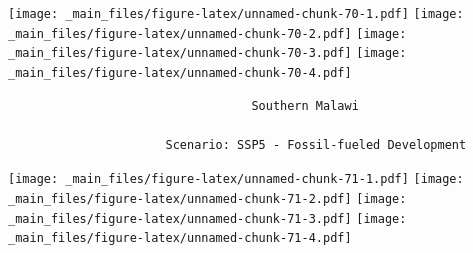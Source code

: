 \documentclass[
]{book}
\begin{document}
\texttt{[image: \_main\_files/figure-latex/unnamed-chunk-70-1.pdf]} \texttt{[image: \_main\_files/figure-latex/unnamed-chunk-70-2.pdf]} \texttt{[image: \_main\_files/figure-latex/unnamed-chunk-70-3.pdf]} \texttt{[image: \_main\_files/figure-latex/unnamed-chunk-70-4.pdf]}

\begin{verbatim}
                                  Southern Malawi
                                  
                      Scenario: SSP5 - Fossil-fueled Development
\end{verbatim}

\texttt{[image: \_main\_files/figure-latex/unnamed-chunk-71-1.pdf]} \texttt{[image: \_main\_files/figure-latex/unnamed-chunk-71-2.pdf]} \texttt{[image: \_main\_files/figure-latex/unnamed-chunk-71-3.pdf]} \texttt{[image: \_main\_files/figure-latex/unnamed-chunk-71-4.pdf]}

  
\end{document}
